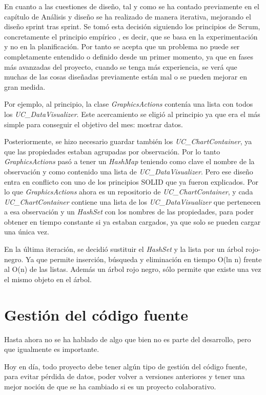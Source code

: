 En cuanto a las cuestiones de dise\~no, tal y como se ha contado previamente en el cap\'itulo
de An\'alisis y dise\~no se ha realizado de manera iterativa, mejorando el dise\~no sprint tras sprint. Se tom\'o esta decisi\'on siguiendo los principios de Scrum, concretamente
el principio emp\'irico \cite{SCRUM:Empiricism}, es decir, que se basa 
en la experimentaci\'on y no
en la planificaci\'on. Por tanto 
se acepta que un problema no puede ser completamente entendido o definido desde un primer
momento, ya que en fases m\'as avanzadas del proyecto, cuando se tenga m\'as experiencia,
se ver\'a que muchas de las cosas dise\~nadas previamente est\'an mal o se pueden
mejorar en gran medida.

Por ejemplo, al principio, la clase \emph{GraphicsActions} conten\'ia una lista con todos los 
\emph{UC\_DataVisualizer}. Este
acercamiento se eligi\'o al principio ya que era el m\'as simple para conseguir el objetivo del mes: mostrar datos.

Posteriormente, se hizo necesario guardar tambi\'en los \emph{UC\_ChartContainer}, ya que las propiedades estaban agrupadas por
observaci\'on. Por lo tanto \emph{GraphicsActions} pas\'o a tener un \emph{HashMap} teniendo como clave el nombre de la 
observaci\'on
y como contenido una lista de \emph{UC\_DataVisualizer}. Pero ese dise\~no entra en conflicto con uno de los principios
SOLID que ya fueron explicados. Por lo que \emph{GraphicsActions} ahora es un repositorio de 
\emph{UC\_ChartContainer},
y cada \emph{UC\_ChartContainer} contiene una lista de los\emph{ UC\_DataVisualizer} que 
pertenecen a esa observaci\'on y un \emph{HashSet}
con los nombres de las propiedades, para poder obtener en tiempo constante si ya estaban cargados, ya que solo se pueden cargar
una \'unica vez.

En la \'ultima iteraci\'on, se decidi\'o sustituir el \emph{HashSet} y la lista por un \'arbol rojo-negro. Ya que permite
inserci\'on, b\'usqueda y eliminaci\'on en tiempo O(ln n) frente al O(n) de las listas. 
Adem\'as un \'arbol rojo negro, s\'olo permite que existe una vez el mismo 
objeto en el \'arbol.

\section{Gesti\'{o}n del c\'{o}digo fuente}
Hasta ahora no se ha hablado de algo que bien no es parte del desarrollo, pero que igualmente es importante.

Hoy en d\'ia, todo proyecto debe tener alg\'un tipo de gesti\'on del c\'odigo fuente, para evitar p\'erdida de datos, 
poder volver a versiones anteriores y tener una mejor noci\'on de que se ha cambiado si es un proyecto colaborativo.

